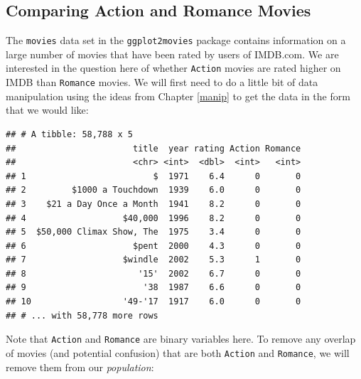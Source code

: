 \documentclass[]{tufte-book}
\newenvironment{Shaded}{\begin{snugshade}}{\end{snugshade}}
\newcommand{\KeywordTok}[1]{\textcolor[rgb]{0.13,0.29,0.53}{\textbf{{#1}}}}
\newcommand{\DecValTok}[1]{\textcolor[rgb]{0.00,0.00,0.81}{{#1}}}
\newcommand{\StringTok}[1]{\textcolor[rgb]{0.31,0.60,0.02}{{#1}}}
\newcommand{\NormalTok}[1]{{#1}}
\begin{document}
\subsection{Comparing Action and Romance
Movies}\label{comparing-action-and-romance-movies}

The \texttt{movies} data set in the \texttt{ggplot2movies} package
contains information on a large number of movies that have been rated by
users of IMDB.com. We are interested in the question here of whether
\texttt{Action} movies are rated higher on IMDB than \texttt{Romance}
movies. We will first need to do a little bit of data manipulation using
the ideas from Chapter \ref{manip} to get the data in the form that we
would like:

\begin{Shaded}
\end{Shaded}

\begin{verbatim}
## # A tibble: 58,788 x 5
##                       title  year rating Action Romance
##                       <chr> <int>  <dbl>  <int>   <int>
## 1                         $  1971    6.4      0       0
## 2         $1000 a Touchdown  1939    6.0      0       0
## 3    $21 a Day Once a Month  1941    8.2      0       0
## 4                   $40,000  1996    8.2      0       0
## 5  $50,000 Climax Show, The  1975    3.4      0       0
## 6                     $pent  2000    4.3      0       0
## 7                   $windle  2002    5.3      1       0
## 8                      '15'  2002    6.7      0       0
## 9                       '38  1987    6.6      0       0
## 10                  '49-'17  1917    6.0      0       0
## # ... with 58,778 more rows
\end{verbatim}

Note that \texttt{Action} and \texttt{Romance} are binary variables
here. To remove any overlap of movies (and potential confusion) that are
both \texttt{Action} and \texttt{Romance}, we will remove them from our
\emph{population}:

\begin{Shaded}
\end{Shaded}
\end{document}
